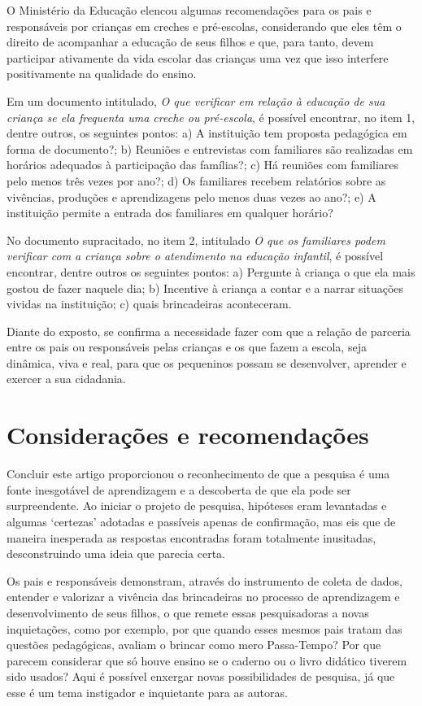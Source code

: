 \begin{refsection}
    O Ministério da Educação elencou algumas recomendações para os pais e responsáveis por crianças em creches e pré-escolas, considerando que eles têm o direito de acompanhar a educação de seus filhos e que, para tanto, devem participar ativamente da vida escolar das crianças uma vez que isso interfere positivamente na qualidade do ensino. 

    Em um documento intitulado, \textit{O que verificar em relação à educação de sua criança se ela frequenta uma creche ou pré-escola}, é possível encontrar, no item 1, dentre outros, os seguintes pontos: a) A instituição tem proposta pedagógica em forma de documento?; b) Reuniões e entrevistas com familiares são realizadas em horários adequados à participação das famílias?; c) Há reuniões com familiares pelo menos três vezes por ano?; d) Os familiares recebem relatórios sobre as vivências, produções e aprendizagens pelo menos duas vezes ao ano?; e) A instituição permite a entrada dos familiares em qualquer horário? 

    No documento supracitado, no item 2, intitulado \textit{O que os familiares podem verificar com a criança sobre o atendimento na educação infantil}, é possível encontrar, dentre outros os seguintes pontos: a) Pergunte à criança o que ela mais gostou de fazer naquele dia; b) Incentive à criança a contar e a narrar situações vividas na instituição; c) quais brincadeiras aconteceram. 

    Diante do exposto, se confirma a necessidade fazer com que a relação de parceria entre os pais ou responsáveis pelas crianças e os que fazem a escola, seja dinâmica, viva e real, para que os pequeninos possam se desenvolver, aprender e exercer a sua cidadania.  


    \section{Considerações e recomendações}

    Concluir este artigo proporcionou o reconhecimento de que a pesquisa é uma fonte inesgotável de aprendizagem e a descoberta de que ela pode ser surpreendente. Ao iniciar o projeto de pesquisa, hipóteses eram levantadas e algumas ‘certezas’ adotadas e passíveis apenas de confirmação, mas eis que de maneira inesperada as respostas encontradas foram totalmente inusitadas, desconstruindo uma ideia que parecia certa. 

    Os pais e responsáveis demonstram, através do instrumento de coleta de dados, entender e valorizar a vivência das brincadeiras no processo de aprendizagem e desenvolvimento de seus filhos, o que remete essas pesquisadoras a novas inquietações, como por exemplo, por que quando esses mesmos pais tratam das questões pedagógicas, avaliam o brincar como mero Passa-Tempo? Por que parecem considerar que só houve ensino se o caderno ou o livro didático tiverem sido usados? Aqui é possível enxergar novas possibilidades de pesquisa, já que esse é um tema instigador e inquietante para as autoras. 


\end{refsection}
